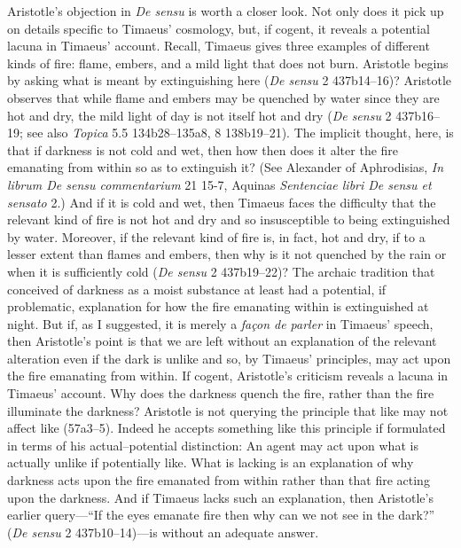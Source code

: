 Aristotle's objection in \emph{De sensu} is worth a closer look. Not only does it pick up on details specific to Timaeus' cosmology, but, if cogent, it reveals a potential lacuna in Timaeus' account. Recall, Timaeus gives three examples of different kinds of fire: flame, embers, and a mild light that does not burn. Aristotle begins by asking what is meant by extinguishing here (\emph{De sensu} 2 437b14--16)? Aristotle observes that while flame and embers may be quenched by water since they are hot and dry, the mild light of day is not itself hot and dry (\emph{De sensu} 2 437b16--19; see also \emph{Topica} 5.5 134b28--135a8, 8 138b19--21). The implicit thought, here, is that if darkness is not cold and wet, then how then does it alter the fire emanating from within so as to extinguish it? (See Alexander of Aphrodisias, \emph{In librum De sensu commentarium} 21 15-7, Aquinas \emph{Sentenciae libri De sensu et sensato} 2.) And if it is cold and wet, then Timaeus faces the difficulty that the relevant kind of fire is not hot and dry and so insusceptible to being extinguished by water. Moreover, if the relevant kind of fire is, in fact, hot and dry, if to a lesser extent than flames and embers, then why is it not quenched by the rain or when it is sufficiently cold (\emph{De sensu} 2 437b19--22)? The archaic tradition that conceived of darkness as a moist substance at least had a potential, if problematic, explanation for how the fire emanating within is extinguished at night. But if, as I suggested, it is merely a \emph{façon de parler} in Timaeus' speech, then Aristotle's point is that we are left without an explanation of the relevant alteration even if the dark is unlike and so, by Timaeus' principles, may act upon the fire emanating from within. If cogent, Aristotle's criticism reveals a lacuna in Timaeus' account. Why does the darkness quench the fire, rather than the fire illuminate the darkness? Aristotle is not querying the principle that like may not affect like (57a3–5). Indeed he accepts something like this principle if formulated in terms of his actual--potential distinction: An agent may act upon what is actually unlike if potentially like. What is lacking is an explanation of why darkness acts upon the fire emanated from within rather than that fire acting upon the darkness. And if Timaeus lacks such an explanation, then Aristotle's earlier query---``If the eyes emanate fire then why can we not see in the dark?'' (\emph{De sensu} 2 437b10--14)---is without an adequate answer.

